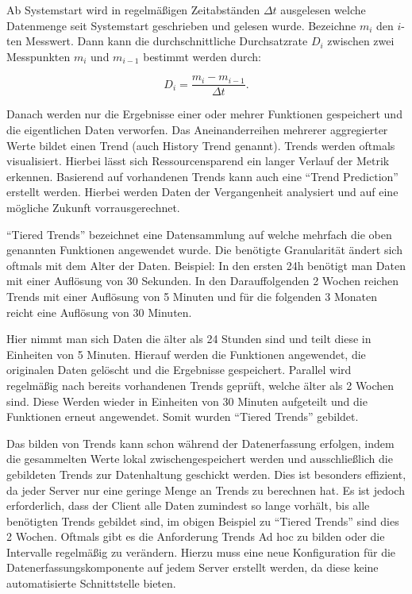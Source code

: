 Ab Systemstart wird in regelmäßigen Zeitabständen $\Delta t$ ausgelesen welche
Datenmenge seit Systemstart geschrieben und gelesen wurde. Bezeichne $m_i$ den
$i$-ten Messwert. Dann kann die durchschnittliche Durchsatzrate $D_i$ zwischen
zwei Messpunkten $m_i$ und $m_{i-1}$ bestimmt werden durch:

\[ D_i = \frac{m_{i} - m_{i-1}}{\Delta t}.\]

Danach werden nur die Ergebnisse einer oder mehrer Funktionen gespeichert und
die eigentlichen Daten verworfen. Das Aneinanderreihen mehrerer aggregierter
Werte bildet einen Trend (auch History Trend genannt). Trends werden oftmals
visualisiert. Hierbei lässt sich Ressourcensparend ein langer Verlauf der
Metrik erkennen. Basierend auf vorhandenen Trends kann auch eine ``Trend
Prediction'' erstellt werden. Hierbei werden Daten der Vergangenheit analysiert
und auf eine mögliche Zukunft vorrausgerechnet.

``Tiered Trends'' bezeichnet eine Datensammlung auf welche mehrfach die oben
genannten Funktionen angewendet wurde. Die benötigte Granularität ändert sich
oftmals mit dem Alter der Daten. Beispiel: In den ersten 24h benötigt man Daten
mit einer Auflösung von 30 Sekunden. In den Darauffolgenden 2 Wochen reichen
Trends mit einer Auflösung von 5 Minuten und für die folgenden 3 Monaten reicht
eine Auflösung von 30 Minuten.

Hier nimmt man sich Daten die älter als 24 Stunden sind und teilt diese in
Einheiten von 5 Minuten. Hierauf werden die Funktionen angewendet, die
originalen Daten gelöscht und die Ergebnisse gespeichert. Parallel wird
regelmäßig nach bereits vorhandenen Trends geprüft, welche älter als 2 Wochen
sind. Diese Werden wieder in Einheiten von 30 Minuten aufgeteilt und die
Funktionen erneut angewendet. Somit wurden ``Tiered Trends'' gebildet.

Das bilden von Trends kann schon während der Datenerfassung erfolgen, indem die
gesammelten Werte lokal zwischengespeichert werden und ausschließlich die
gebildeten Trends zur Datenhaltung geschickt werden. Dies ist besonders
effizient, da jeder Server nur eine geringe Menge an Trends zu berechnen hat.
Es ist jedoch erforderlich, dass der Client alle Daten zumindest so lange
vorhält, bis alle benötigten Trends gebildet sind, im obigen Beispiel zu
``Tiered Trends'' sind dies 2 Wochen. Oftmals gibt es die Anforderung Trends
Ad hoc zu bilden oder die Intervalle regelmäßig zu verändern. Hierzu muss eine
neue Konfiguration für die Datenerfassungskomponente auf jedem Server erstellt
werden, da diese keine automatisierte Schnittstelle bieten.

